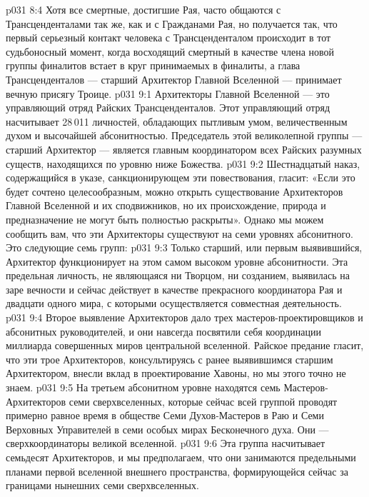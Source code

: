 \vs p031 8:4 Хотя все смертные, достигшие Рая, часто общаются с Трансценденталами так же, как и с Гражданами Рая, но получается так, что первый серьезный контакт человека с Трансценденталом происходит в тот судьбоносный момент, когда восходящий смертный в качестве члена новой группы финалитов встает в круг принимаемых в финалиты, а глава Трансценденталов --- старший Архитектор Главной Вселенной --- принимает вечную присягу Троице.
\vs p031 9:1 Архитекторы Главной Вселенной --- это управляющий отряд Райских Трансценденталов. Этот управляющий отряд насчитывает 28\,011 личностей, обладающих пытливым умом, величественным духом и высочайшей абсонитностью. Председатель этой великолепной группы --- старший Архитектор --- является главным координатором всех Райских разумных существ, находящихся по уровню ниже Божества.
\vs p031 9:2 Шестнадцатый наказ, содержащийся в указе, санкционирующем эти повествования, гласит: «Если это будет сочтено целесообразным, можно открыть существование Архитекторов Главной Вселенной и их сподвижников, но их происхождение, природа и предназначение не могут быть полностью раскрыты». Однако мы можем сообщить вам, что эти Архитекторы существуют на семи уровнях абсонитного. Это следующие семь групп:
\vs p031 9:3 \bibnobreakspace {} Только старший, или первым выявившийся, Архитектор функционирует на этом самом высоком уровне абсонитности. Эта предельная личность, не являющаяся ни Творцом, ни созданием, выявилась на заре вечности и сейчас действует в качестве прекрасного координатора Рая и двадцати одного мира, с которыми осуществляется совместная деятельность.
\vs p031 9:4 \pc {}\bibnobreakspace {} Второе выявление Архитекторов дало трех мастеров\hyp{}проектировщиков и абсонитных руководителей, и они навсегда посвятили себя координации миллиарда совершенных миров центральной вселенной. Райское предание гласит, что эти трое Архитекторов, консультируясь с ранее выявившимся старшим Архитектором, внесли вклад в проектирование Хавоны, но мы этого точно не знаем.
\vs p031 9:5 \pc {}\bibnobreakspace {} На третьем абсонитном уровне находятся семь Мастеров\hyp{}Архитекторов семи сверхвселенных, которые сейчас всей группой проводят примерно равное время в обществе Семи Духов\hyp{}Мастеров в Раю и Семи Верховных Управителей в семи особых мирах Бесконечного духа. Они --- сверхкоординаторы великой вселенной.
\vs p031 9:6 \pc {}\bibnobreakspace {} Эта группа насчитывает семьдесят Архитекторов, и мы предполагаем, что они занимаются предельными планами первой вселенной внешнего пространства, формирующейся сейчас за границами нынешних семи сверхвселенных.
